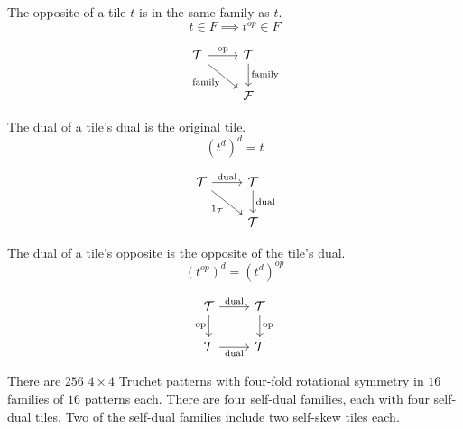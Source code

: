 \documentclass{tufte-book}
\begin{document}


\begin{theorem}
The opposite of a tile $t$ is in the same family as $t$. 
$$t\in F \implies t^{op} \in F$$
\end{theorem}
\begin{marginfigure}[-7cm]
\[
\begin{tikzcd}
	{\mathcal{T}} & {\mathcal{T}} \\
	& {\mathcal{F}}
	\arrow["{\small\text{op}}", from=1-1, to=1-2]
	\arrow["{\small\text{family}}"', from=1-1, to=2-2]
	\arrow["{\small\text{family}}", from=1-2, to=2-2]
\end{tikzcd}
\]
\end{marginfigure}
\begin{theorem}
The dual of a tile's dual is the original tile. 
$$(t^d)^d = t$$
\end{theorem}
\begin{marginfigure}[-5cm]
\[\begin{tikzcd}
	{\mathcal{T}} & {\mathcal{T}} \\
	& {\mathcal{T}}
	\arrow["{\small\text{dual}}", from=1-1, to=1-2]
	\arrow["{{\small 1_\mathcal{T}}}"', from=1-1, to=2-2]
	\arrow["{\small\text{dual}}", from=1-2, to=2-2]
\end{tikzcd}\]
\end{marginfigure}

\begin{theorem}
The dual of a tile's opposite is the opposite of the tile's dual. 
$$(t^{op})^d = (t^d)^{op}$$
\end{theorem}
\begin{marginfigure}[-3cm]
\[
\begin{tikzcd}
	{\mathcal{T}} & {\mathcal{T}} \\
	{\mathcal{T}} & {\mathcal{T}}
	\arrow["{\small\text{dual}}", from=1-1, to=1-2]
	\arrow["{\small\text{op}}"', from=1-1, to=2-1]
	\arrow["{\small\text{op}}", from=1-2, to=2-2]
	\arrow["{\small\text{dual}}"', from=2-1, to=2-2]
\end{tikzcd}
\]
\end{marginfigure}
\begin{theorem}
There are $256$ $4\times 4$ Truchet patterns with four-fold rotational symmetry in $16$ families of $16$ patterns each. There are four self-dual families, each with four self-dual tiles. Two of the self-dual families include two self-skew tiles each.  
\end{theorem}
\end{document}
